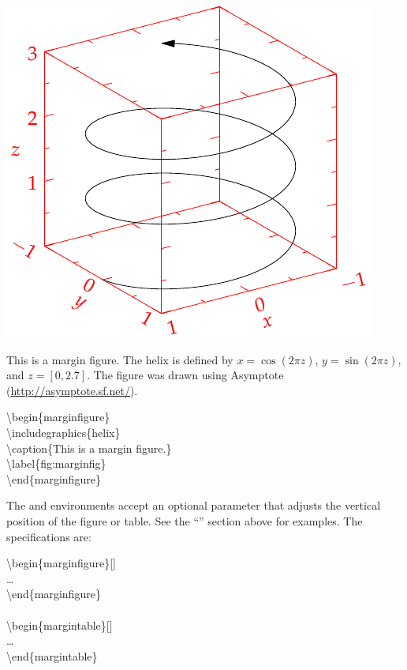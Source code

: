 \begin{marginfigure}%
  \includegraphics[width=\linewidth]{images/helix}
  \caption{This is a margin figure.  The helix is defined by 
    $x = \cos(2\pi z)$, $y = \sin(2\pi z)$, and $z = [0, 2.7]$.  The figure was
    drawn using Asymptote (\protect\url{http://asymptote.sf.net/}).}
  \label{fig:marginfig}
\end{marginfigure}

\begin{docspec}
\textbackslash begin\{marginfigure\}\\
  \qquad\textbackslash includegraphics\{helix\}\\
  \qquad\textbackslash caption\{This is a margin figure.\}\\
  \qquad\textbackslash label\{fig:marginfig\}\\
\textbackslash end\{marginfigure\}\\
\end{docspec}

The  and  environments accept an optional parameter  that adjusts the vertical position of the figure or table.  See the ``'' section above for examples.  The specifications are:
\begin{docspec}
  \textbackslash{begin\{marginfigure\}[]}\\
  \qquad\ldots\\
  \textbackslash{end\{marginfigure\}}\\
  \mbox{}\\
  \textbackslash{begin\{margintable\}[]}\\
  \qquad\ldots\\
  \textbackslash{end\{margintable\}}\\
\end{docspec}

